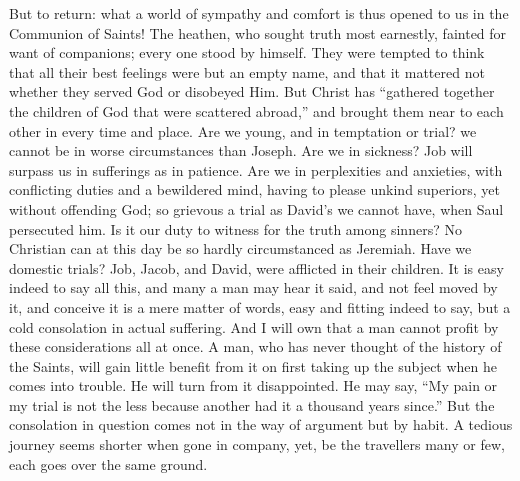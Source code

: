 But to return: what a world of sympathy and comfort is thus opened
to us in the Communion of Saints! The heathen, who sought truth most
earnestly, fainted for want of companions; every one stood by himself.
They were tempted to think that all their best feelings were but an
empty name, and that it mattered not whether they served God or
disobeyed Him. But Christ has ``gathered together the children of
God that were scattered abroad,'' and brought them near to each
other in every time and place. Are we young, and in temptation or
trial? we cannot be in worse circumstances than Joseph. Are we in
sickness? Job will surpass us in sufferings as in patience. Are we in
perplexities and anxieties, with conflicting duties and a bewildered
mind, having to please unkind superiors, yet without offending God; so
grievous a trial as David's we cannot have, when Saul persecuted
him. Is it our duty to witness for the truth among sinners? No
Christian can at this day be so hardly circumstanced as Jeremiah. Have
we domestic trials? Job, Jacob, and David, were afflicted in their
children. It is easy indeed to say all this, and many a man may hear
it said, and not feel moved by it, and conceive it is a mere matter of
words, easy and fitting indeed to say, but a cold consolation in
actual suffering. And I will own that a man cannot profit by these
considerations all at once. A man, who has never thought of the
history of the Saints, will gain little benefit from it on first
taking up the subject when he comes into trouble. He will turn from it
disappointed. He may say, ``My pain or my trial is not the less
because another had it a thousand years since.'' But the
consolation in question comes not in the way of argument but by habit.
A tedious journey seems shorter when gone in company, yet, be the
travellers many or few, each goes over the same ground.

